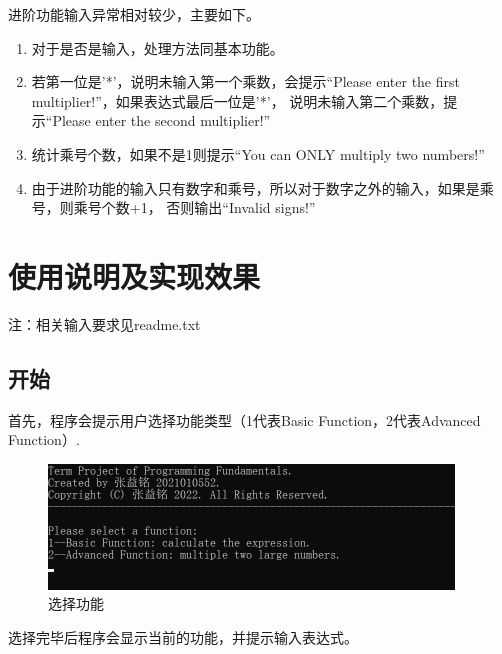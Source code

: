 \documentclass[a4paper, 11pt, UTF8]{ctexart}
\begin{document}
进阶功能输入异常相对较少，主要如下。

\begin{enumerate}
    \item 对于是否是输入，处理方法同基本功能。
    \item 若第一位是'*'，说明未输入第一个乘数，会提示“Please enter the first multiplier!”，如果表达式最后一位是'*'，
          说明未输入第二个乘数，提示“Please enter the second multiplier!”
    \item 统计乘号个数，如果不是1则提示“You can ONLY multiply two numbers!”
    \item 由于进阶功能的输入只有数字和乘号，所以对于数字之外的输入，如果是乘号，则乘号个数+1，
          否则输出“Invalid signs!”
\end{enumerate}

\section{使用说明及实现效果}

注：相关输入要求见readme.txt

\subsection{开始}

首先，程序会提示用户选择功能类型（1代表Basic Function，2代表Advanced Function）.

\begin{figure}[H]
    \centering
    \includegraphics[width=0.96\textwidth]{begin.png}
    \caption{选择功能}
\end{figure}

选择完毕后程序会显示当前的功能，并提示输入表达式。
\end{document}
